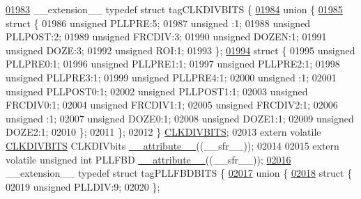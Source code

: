 \begin{DoxyCode}
\hypertarget{a00009_source_l01983}{}\hyperlink{a00008}{01983} \_\_extension\_\_ \textcolor{keyword}{typedef} \textcolor{keyword}{struct }tagCLKDIVBITS \{
\hypertarget{a00009_source_l01984}{}\hyperlink{a00009}{01984}   \textcolor{keyword}{union }\{
\hypertarget{a00009_source_l01985}{}\hyperlink{a00009}{01985}     \textcolor{keyword}{struct }\{
01986       \textcolor{keywordtype}{unsigned} PLLPRE:5;
01987       \textcolor{keywordtype}{unsigned} :1;
01988       \textcolor{keywordtype}{unsigned} PLLPOST:2;
01989       \textcolor{keywordtype}{unsigned} FRCDIV:3;
01990       \textcolor{keywordtype}{unsigned} DOZEN:1;
01991       \textcolor{keywordtype}{unsigned} DOZE:3;
01992       \textcolor{keywordtype}{unsigned} ROI:1;
01993     \};
\hypertarget{a00009_source_l01994}{}\hyperlink{a00009}{01994}     \textcolor{keyword}{struct }\{
01995       \textcolor{keywordtype}{unsigned} PLLPRE0:1;
01996       \textcolor{keywordtype}{unsigned} PLLPRE1:1;
01997       \textcolor{keywordtype}{unsigned} PLLPRE2:1;
01998       \textcolor{keywordtype}{unsigned} PLLPRE3:1;
01999       \textcolor{keywordtype}{unsigned} PLLPRE4:1;
02000       \textcolor{keywordtype}{unsigned} :1;
02001       \textcolor{keywordtype}{unsigned} PLLPOST0:1;
02002       \textcolor{keywordtype}{unsigned} PLLPOST1:1;
02003       \textcolor{keywordtype}{unsigned} FRCDIV0:1;
02004       \textcolor{keywordtype}{unsigned} FRCDIV1:1;
02005       \textcolor{keywordtype}{unsigned} FRCDIV2:1;
02006       \textcolor{keywordtype}{unsigned} :1;
02007       \textcolor{keywordtype}{unsigned} DOZE0:1;
02008       \textcolor{keywordtype}{unsigned} DOZE1:1;
02009       \textcolor{keywordtype}{unsigned} DOZE2:1;
02010     \};
02011   \};
02012 \} \hyperlink{a00008_db/d7b/a00296}{CLKDIVBITS};
02013 \textcolor{keyword}{extern} \textcolor{keyword}{volatile} \hyperlink{a00008_db/d7b/a00296}{CLKDIVBITS} CLKDIVbits \hyperlink{a00009_a493c46f03454991ccc5aa7a6e1dfb2a7}{\_\_attribute\_\_}((\_\_sfr\_\_));
02014 
02015 \textcolor{keyword}{extern} \textcolor{keyword}{volatile} \textcolor{keywordtype}{unsigned} \textcolor{keywordtype}{int}  PLLFBD \hyperlink{a00009_a493c46f03454991ccc5aa7a6e1dfb2a7}{\_\_attribute\_\_}((\_\_sfr\_\_));
\hypertarget{a00009_source_l02016}{}\hyperlink{a00008}{02016} \_\_extension\_\_ \textcolor{keyword}{typedef} \textcolor{keyword}{struct }tagPLLFBDBITS \{
\hypertarget{a00009_source_l02017}{}\hyperlink{a00009}{02017}   \textcolor{keyword}{union }\{
\hypertarget{a00009_source_l02018}{}\hyperlink{a00009}{02018}     \textcolor{keyword}{struct }\{
02019       \textcolor{keywordtype}{unsigned} PLLDIV:9;
02020     \};

\end{DoxyCode}
